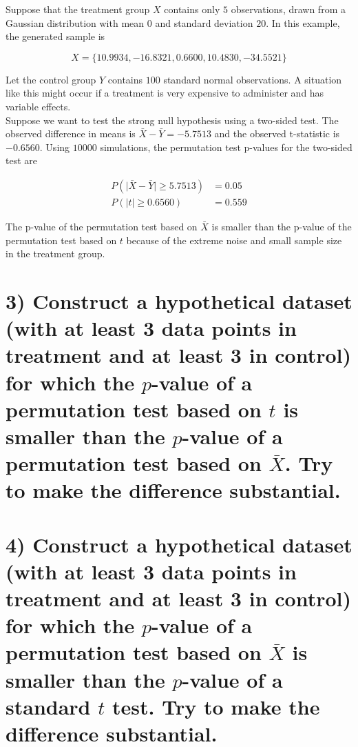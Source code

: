 \documentclass[11pt]{article}
\newcommand{\pr}{P} %
\begin{document}
Suppose that the treatment group $X$ contains only $5$ observations, drawn from a Gaussian distribution with mean $0$ and standard deviation $20$.  In this example, the generated sample is

$$ X = \{ 10.9934, -16.8321,   0.6600,  10.4830, -34.5521\}$$

Let the control group $Y$ contains $100$ standard normal observations.  A situation like this might occur if a treatment is very expensive to administer and has variable effects.  \\

Suppose we want to test the strong null hypothesis using a two-sided test.  The observed difference in means is $\bar{X} - \bar{Y} = -5.7513$ and the observed t-statistic is $-0.6560$.  Using $10000$ simulations, the permutation test p-values for the two-sided test are

\begin{align*}
\pr(\lvert \bar{X} - \bar{Y} \rvert \geq 5.7513) &= 0.05 \\
\pr(\lvert t\rvert \geq 0.6560) &= 0.559
\end{align*}

The p-value of the permutation test based on $\bar{X}$ is smaller than the p-value of the permutation test based on $t$ because of the extreme noise and small sample size in the treatment group.  

\section*{3) Construct a hypothetical dataset (with at least 3 data points in treatment and at least 3 in control) for which the $p$-value of a permutation test based on $t$ is smaller than the $p$-value of a permutation test based on $\bar{X}$. Try to make the difference substantial.}


\section*{4) Construct a hypothetical dataset (with at least 3 data points in treatment and at least 3 in control) for which the $p$-value of a permutation test based on $\bar{X}$ is smaller than the $p$-value of a standard $t$ test. Try to make the difference substantial.}
\end{document}
